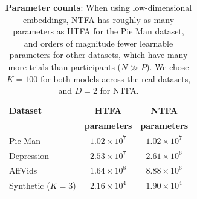 \documentclass[twoside]{article}
\begin{document}
\begin{table}[!t]
\caption{\textbf{Parameter counts}: When using low-dimensional embeddings, NTFA has roughly as many parameters as HTFA for the Pie Man dataset, and orders of magnitude fewer learnable parameters for other datasets, which have many more trials than participants ($N \gg P$).  We chose $K=100$ for both models across the real datasets, and $D=2$ for NTFA.}
\label{table:parameter_counts}
\begin{center}
\begin{tabular}{lcc}
\toprule
\textbf{Dataset} & \textbf{HTFA} & \textbf{NTFA} \\
 & \textbf{parameters} & \textbf{parameters} \\
\midrule
Pie Man  & $1.02\times 10^7$ & $1.02\times 10^7$ \\
Depression & $2.53\times 10^7$  & $2.61 \times 10^6$ \\
AffVids & $1.64\times10^8$ & $8.88\times 10^6$ \\
Synthetic ($K=3$) & $2.16\times10^4$ & $1.90\times10^4$ \\
\bottomrule
\end{tabular}
\end{center}
\end{table}
\end{document}
